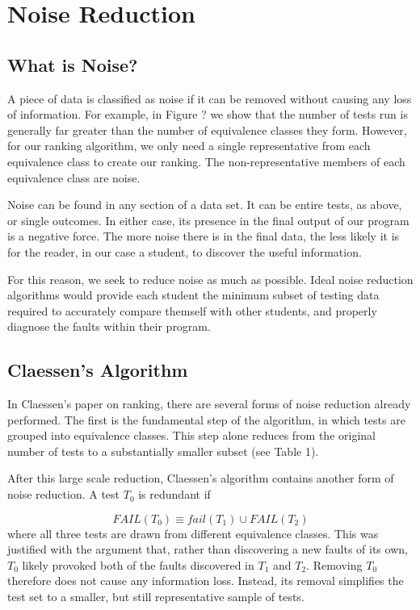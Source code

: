 \documentclass[11pt,twoside]{article}
\newcommand\fail{\mathit{FAIL}}
\begin{document}
\section{Noise Reduction}

\subsection{What is Noise?}
A piece of data is classified as noise if it can be removed without causing any loss of information. For example, in Figure {?} we show that the number of tests run is generally far greater than the number of equivalence classes they form. However, for our ranking algorithm, we only need a single representative from each equivalence class to create our ranking. The non-representative members of each equivalence class are noise. 

Noise can be found in any section of a data set. It can be entire tests, as above, or single outcomes. In either case, its presence in the final output of our program is a negative force. The more noise there is in the final data, the less likely it is for the reader, in our case a student, to discover the useful information.

For this reason, we seek to reduce noise as much as possible. Ideal noise reduction algorithms would provide each student the minimum subset of testing data required to accurately compare themself with other students, and properly diagnose the faults within their program.


\subsection{Claessen's Algorithm}
In Claessen's paper on ranking, there are several forms of noise reduction already performed. The first is the fundamental step of the algorithm, in which tests are grouped into equivalence classes. This step alone reduces from the original number of tests to a substantially smaller subset (see Table 1).

After this large scale reduction, Claessen's algorithm contains another form of noise reduction. A test $T_0$ is redundant if

$$\fail (T_0) \equiv fail(T_1) \cup \fail(T_2)$$
where all three tests are drawn from different equivalence classes. This was justified with the argument that, rather than discovering a new faults of its own, $T_0$ likely provoked both of the faults discovered in $T_1$ and $T_2$. Removing $T_0$ therefore does not cause any information loss. Instead, its removal simplifies the test set to a smaller, but still representative sample of tests.
\end{document}
